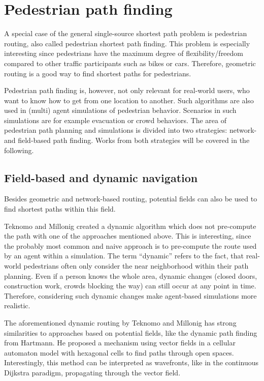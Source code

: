 \section{Pedestrian path finding}
\label{sec:pedestrian-path-planning}
	
	A special case of the general single-source shortest path problem is pedestrian routing, also called pedestrian shortest path finding.
	This problem is especially interesting since pedestrians have the maximum degree of flexibility/freedom compared to other traffic participants such as bikes or cars.
	Therefore, geometric routing is a good way to find shortest paths for pedestrians.
	
	Pedestrian path finding is, however, not only relevant for real-world users, who want to know how to get from one location to another.
	Such algorithms are also used in (multi) agent simulations of pedestrian behavior.
	Scenarios in such simulations are for example evacuation or crowd behaviors.
	The area of pedestrian path planning and simulations is divided into two strategies: network- and field-based path finding\cite{hartmann-geodesic}.
	Works from both strategies will be covered in the following.
	
	\subsection{Field-based and dynamic navigation}
	\label{subsec:field-based-routing}
	
		Besides geometric and network-based routing, potential fields can also be used to find shortest paths within this field.
		
		Teknomo and Millonig created a dynamic algorithm which does not pre-compute the path with one of the approaches mentioned above\cite{teknomo-millonig-routing}.
		This is interesting, since the probably most common and naive approach is to pre-compute the route used by an agent within a simulation.
		The term \enquote{dynamic} refers to the fact, that real-world pedestrians often only consider the near neighborhood within their path planning.
		Even if a person knows the whole area, dynamic changes (closed doors, construction work, crowds blocking the way) can still occur at any point in time.
		Therefore, considering such dynamic changes make agent-based simulations more realistic.
		
		The aforementioned dynamic routing by Teknomo and Millonig has strong similarities to approaches based on potential fields, like the dynamic path finding from Hartmann\cite{hartmann-geodesic}.
		He proposed a mechanism using vector fields in a cellular automaton model with hexagonal cells to find paths through open spaces.
		Interestingly, this method can be interpreted as wavefronts, like in the continuous Dijkstra paradigm, propagating through the vector field.
			
